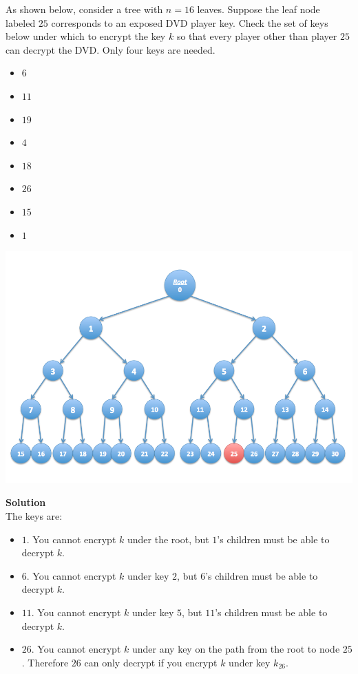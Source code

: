 \documentclass[a4paper,12pt]{article}
\begin{document}
As shown below, consider a tree with $n=16$ leaves. Suppose the leaf node labeled $25$ corresponds to an exposed DVD player key. Check the set of keys below under which to encrypt the key $k$ so that every player other than player $25$ can decrypt the DVD. Only four keys are needed.
%
\begin{itemize}
\item $6$
\item $11$
\item $19$
\item $4$
\item $18$
\item $26$
\item $15$
\item $1$
\end{itemize}
%
\begin{center}
\includegraphics[scale=0.4]{question8-tree.png}
\end{center}

\textbf{Solution}\\

The keys are:
%
\begin{itemize}
\item $1$. You cannot encrypt $k$ under the root, but $1$'s children must be able to decrypt $k$.
\item $6$. You cannot encrypt $k$ under key $2$, but $6$'s children must be able to decrypt $k$.
\item $11$. You cannot encrypt $k$ under key $5$, but $11$'s children must be able to decrypt $k$.
\item $26$. You cannot encrypt $k$ under any key on the path from the root to node $25$. Therefore $26$ can only decrypt if you encrypt $k$ under key $k_{26}$.
\end{itemize}
\end{document}
